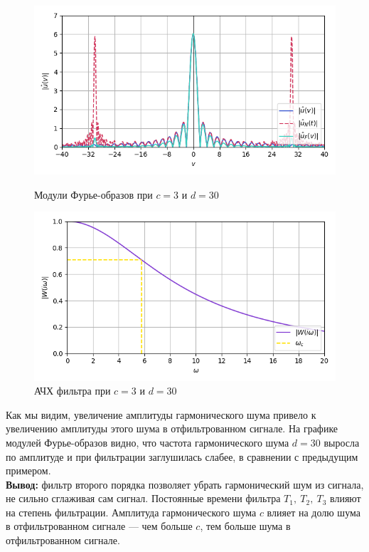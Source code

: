 \documentclass[a4paper]{article}
\begin{document}
\begin{figure}[H]
    \begin{minipage}{0.49\textwidth}
        \centering \includegraphics[width=\textwidth]{sources/second/part2/c=3_d=30 T1=1e-08_T2=0.111_T3=0.111/2_fft_cmp.png}
        \caption{Модули Фурье-образов при $c = 3$ и $d = 30$}
    \end{minipage}\hfill
    \begin{minipage}{0.49\textwidth}
        \centering \includegraphics[width=\textwidth]{sources/second/part2/c=3_d=30 T1=1e-08_T2=0.111_T3=0.111/3_filter.png}
        \caption{АЧХ фильтра при $c = 3$ и $d = 30$}
    \end{minipage}
\end{figure}
Как мы видим, увеличение амплитуды гармонического шума привело к увеличению амплитуды этого шума в отфильтрованном сигнале. На графике модулей Фурье-образов видно, что частота гармонического шума $d = 30$ выросла по амплитуде и при фильтрации заглушилась слабее, в сравнении с предыдущим примером.\\[0.5em]
\textbf{Вывод:} фильтр второго порядка позволяет убрать гармонический шум из сигнала, не сильно сглаживая сам сигнал. Постоянные времени фильтра $T_1,\ T_2,\ T_3$ влияют на степень фильтрации. Амплитуда гармонического шума $c$ влияет на долю шума в отфильтрованном сигнале --- чем больше $c$, тем больше шума в отфильтрованном сигнале.
\end{document}
